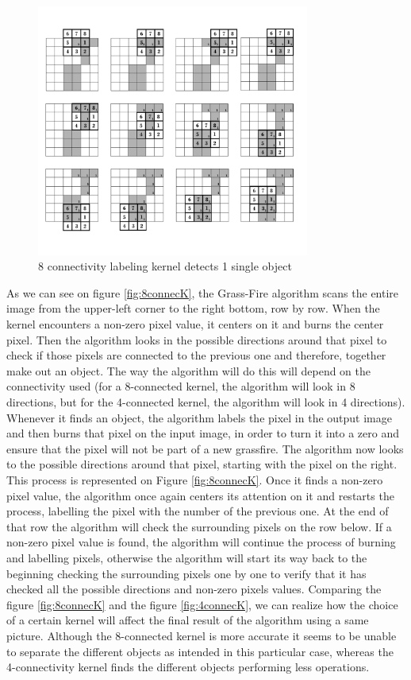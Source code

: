 \begin{figure}[htbp]
\centering
\includegraphics[width=0.8\textwidth]{Pictures/Theory/8connec_kernel.png}
\caption{8 connectivity labeling kernel detects 1 single object}
\label{fig:8connecK}
\end{figure}

As we can see on figure \eqref{fig:8connecK}, the Grass-Fire algorithm scans the entire image from the upper-left corner to the right bottom, row by row. When the kernel encounters a non-zero pixel value, it centers on it and burns the center pixel. Then the algorithm looks in the possible directions around that pixel to check if those pixels are connected to the previous one and therefore, together make out an object. The way the algorithm will do this will depend on the connectivity used (for a 8-connected kernel, the algorithm will look in 8 directions, but for the 4-connected kernel, the algorithm will look in 4 directions).
Whenever it finds an object, the algorithm labels the pixel in the output image and then burns that pixel on the input image, in order to turn it into a zero and ensure that the pixel will not be part of a new grassfire.
The algorithm now looks to the possible directions around that pixel, starting with the pixel on the right. This process is represented on Figure \eqref{fig:8connecK}. Once it finds a non-zero pixel value, the algorithm once again centers its attention on it and restarts the process, labelling the pixel with the number of the previous one. At the end of that row the algorithm will check the surrounding pixels on the row below. If a non-zero pixel value is found, the algorithm will continue the process of burning and labelling pixels, otherwise the algorithm will start its way back to the beginning checking the surrounding pixels one by one to verify that it has checked all the possible directions and non-zero pixels values.
Comparing the figure \eqref{fig:8connecK} and the figure \eqref{fig:4connecK}, we can realize how the choice of a certain kernel will affect the final result of the algorithm using a same picture. Although the 8-connected kernel is more accurate it seems to be unable to separate the different objects as intended in this particular case, whereas the 4-connectivity kernel finds the different objects performing less operations.

